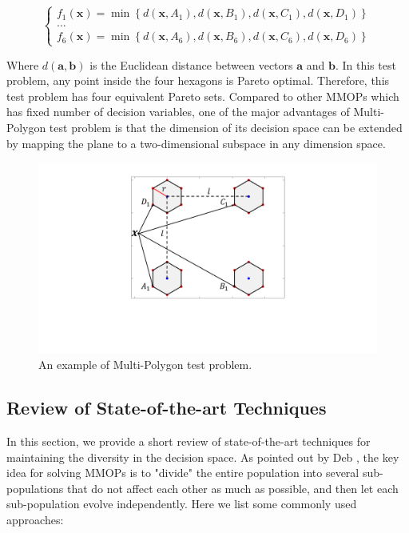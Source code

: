 \documentclass[conference]{IEEEtran}
\begin{document}
\begin{equation*}
\left\{
\begin{array}{c}{f_{1}(\boldsymbol{x})=\min \left\{d\left(\boldsymbol{x}, A_{1}\right), d\left(\boldsymbol{x}, B_{1}\right), d\left(\boldsymbol{x}, C_{1}\right), d\left(\boldsymbol{x}, D_{1}\right)\right\}} \\ \dots \\ {{f_{6}}(\boldsymbol{x})=\min \left\{d\left(\boldsymbol{x}, A_{6}\right), d\left(\boldsymbol{x}, B_{6}\right), d\left(\boldsymbol{x}, C_{6}\right), d\left(\boldsymbol{x}, D_{6}\right)\right\}}\end{array}
\right.
\end{equation*}

Where $d(\boldsymbol{a} ,\boldsymbol{b})$ is the Euclidean distance between vectors $\boldsymbol{a}$ and $\boldsymbol{b}$.  In this test problem, any point inside the four hexagons is Pareto optimal. Therefore, this test problem has four equivalent Pareto sets. Compared to other MMOPs which has fixed number of decision variables, one of the major advantages of Multi-Polygon test problem is that the dimension of its decision space can be extended by mapping the plane to a two-dimensional subspace in any dimension space.

\begin{figure}[htbp]
	\centering
	\includegraphics[width=.25\textwidth]{Section2/Problem}
	\caption{An example of Multi-Polygon test problem.}
	\label{fig:Multi-Polygon Problem}
\end{figure}

\subsection{Review of State-of-the-art Techniques}
\label{Review of State-of-the-art Techniques}
In this section, we provide a short review of state-of-the-art techniques for maintaining the diversity in the decision space. As pointed out by Deb \cite{Deb2001}, the key idea for solving MMOPs is to "divide" the entire population into several sub-populations that do not affect each other as much as possible, and then let each sub-population evolve independently. Here we list some commonly used approaches:
\end{document}
